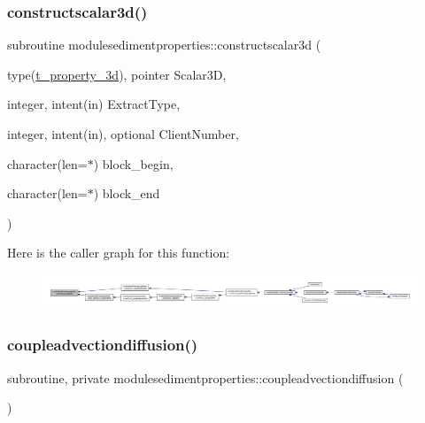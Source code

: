 \subsubsection{\texorpdfstring{constructscalar3d()}{constructscalar3d()}}
{\footnotesize\ttfamily subroutine modulesedimentproperties\+::constructscalar3d (\begin{DoxyParamCaption}\item[{type(\mbox{\hyperlink{structmodulesedimentproperties_1_1t__property__3d}{t\+\_\+property\+\_\+3d}}), pointer}]{Scalar3D,  }\item[{integer, intent(in)}]{Extract\+Type,  }\item[{integer, intent(in), optional}]{Client\+Number,  }\item[{character(len=$\ast$)}]{block\+\_\+begin,  }\item[{character(len=$\ast$)}]{block\+\_\+end }\end{DoxyParamCaption})\hspace{0.3cm}{\ttfamily [private]}}

Here is the caller graph for this function\+:\nopagebreak
\begin{figure}[H]
\begin{center}
\leavevmode
\includegraphics[width=350pt]{namespacemodulesedimentproperties_a8f2d8b343c149475187c15596c0bde5e_icgraph}
\end{center}
\end{figure}
\mbox{\label{namespacemodulesedimentproperties_a7337c30e5645edde83be4dae7d323f3b}} 
\subsubsection{\texorpdfstring{coupleadvectiondiffusion()}{coupleadvectiondiffusion()}}
{\footnotesize\ttfamily subroutine, private modulesedimentproperties\+::coupleadvectiondiffusion (\begin{DoxyParamCaption}{ }\end{DoxyParamCaption})\hspace{0.3cm}{\ttfamily [private]}}

